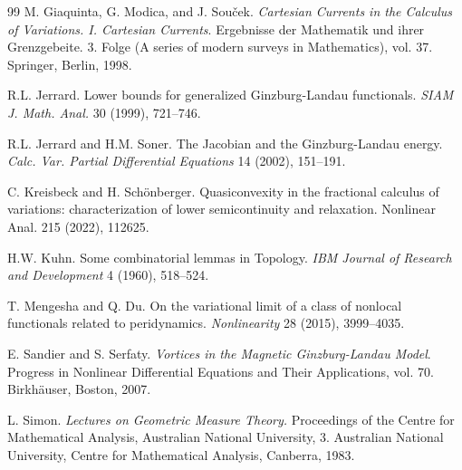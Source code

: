 \documentclass[11pt]{article}
\begin{document}
\begin{thebibliography}{99}
 M. Giaquinta, G. Modica, and J. Sou\v cek. {\em Cartesian Currents in the Calculus of Variations. I. Cartesian Currents}.   Ergebnisse der Mathematik und ihrer Grenzgebeite. 3. Folge
(A series of modern surveys in Mathematics), vol. 37. Springer, Berlin, 1998.

 R.L. Jerrard. Lower bounds for generalized Ginzburg-Landau functionals. {\em SIAM J.
Math. Anal.} 30 (1999), 721--746.

 R.L. Jerrard and H.M. Soner. The Jacobian and the Ginzburg-Landau energy. {\em Calc.
Var. Partial Differential Equations} 14 (2002), 151--191.

 C. Kreisbeck and  H. Sch\"onberger. Quasiconvexity in the fractional calculus of variations: characterization of lower semicontinuity and relaxation. Nonlinear Anal. 215 (2022), 112625.

 H.W. Kuhn. Some combinatorial lemmas in Topology. {\em IBM Journal of Research and Development} 4 (1960), 518--524.  

 T. Mengesha and Q. Du. On the variational limit of a class of nonlocal functionals related to peridynamics. {\em Nonlinearity} 28 (2015), 3999--4035.

 E. Sandier and S. Serfaty. {\em  Vortices in the Magnetic Ginzburg-Landau Model}.  Progress in Nonlinear Differential
Equations and Their Applications, vol. 70. Birkh\"auser, Boston, 2007.

 L. Simon. {\em Lectures on Geometric Measure Theory.} Proceedings of the Centre for Mathematical Analysis, Australian National University, 3. Australian National University, Centre for Mathematical Analysis, Canberra, 1983.

\end{thebibliography}
\end{document}
